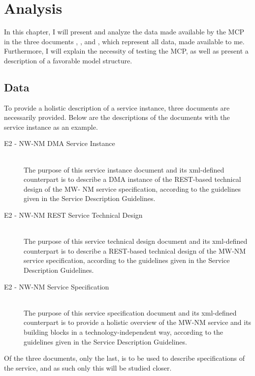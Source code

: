 \chapter{Analysis}

In this chapter, I will present and analyze the data made available by the MCP in the three documents , , and , which represent all data, made available to me. Furthermore, I will explain the necessity of testing the MCP, as well as present a description of a favorable model structure. 

\section{Data}

To provide a holistic description of a service instance, three documents are necessarily provided. Below are the descriptions of the documents with the service instance  as an example.
\begin{description}
	\item[E2 - NW-NM DMA Service Instance]\ \\
	The purpose of this service instance document and its xml-defined counterpart is to describe a DMA instance of the REST-based technical design of the MW- NM service specification, according to the guidelines given in the Service Description Guidelines.
	\item[E2 - NW-NM REST Service Technical Design]\ \\
	The purpose of this service technical design document and its xml-defined counterpart is to describe a REST-based technical design of the MW-NM service specification, according to the guidelines given in the Service Description Guidelines.
	\item[E2 - NW-NM Service Specification]\ \\
	The purpose of this service specification document and its xml-defined counterpart is to provide a holistic overview of the MW-NM service and its building blocks in a technology-independent way, according to the guidelines given in the Service Description Guidelines.
\end{description}
Of the three documents, only the last,  is to be used to describe specifications of the service, and as such only this will be studied closer.

